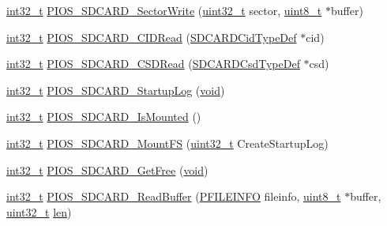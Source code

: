 \begin{DoxyCompactItemize}
\hyperlink{group___n_a_m_e_gafd12020da5a235dfcf0c3c748fb5baed}{int32\-\_\-t} \hyperlink{group___p_i_o_s___s_d_c_a_r_d_ga403eed1235aab15c3f4dffd530359a41}{P\-I\-O\-S\-\_\-\-S\-D\-C\-A\-R\-D\-\_\-\-Sector\-Write} (\hyperlink{stdint_8h_a435d1572bf3f880d55459d9805097f62}{uint32\-\_\-t} sector, \hyperlink{stdint_8h_aba7bc1797add20fe3efdf37ced1182c5}{uint8\-\_\-t} $\ast$buffer)
\item 
\hyperlink{group___n_a_m_e_gafd12020da5a235dfcf0c3c748fb5baed}{int32\-\_\-t} \hyperlink{group___p_i_o_s___s_d_c_a_r_d_gac315de3fafd3370f39b241ec5b7a62ca}{P\-I\-O\-S\-\_\-\-S\-D\-C\-A\-R\-D\-\_\-\-C\-I\-D\-Read} (\hyperlink{struct_s_d_c_a_r_d_cid_type_def}{S\-D\-C\-A\-R\-D\-Cid\-Type\-Def} $\ast$cid)
\item 
\hyperlink{group___n_a_m_e_gafd12020da5a235dfcf0c3c748fb5baed}{int32\-\_\-t} \hyperlink{group___p_i_o_s___s_d_c_a_r_d_gaee8853b1431664b014c45d438c4fb094}{P\-I\-O\-S\-\_\-\-S\-D\-C\-A\-R\-D\-\_\-\-C\-S\-D\-Read} (\hyperlink{struct_s_d_c_a_r_d_csd_type_def}{S\-D\-C\-A\-R\-D\-Csd\-Type\-Def} $\ast$csd)
\item 
\hyperlink{group___n_a_m_e_gafd12020da5a235dfcf0c3c748fb5baed}{int32\-\_\-t} \hyperlink{group___p_i_o_s___s_d_c_a_r_d_ga2a97c001315383e1e5bee1beb6bd9b93}{P\-I\-O\-S\-\_\-\-S\-D\-C\-A\-R\-D\-\_\-\-Startup\-Log} (\hyperlink{group___n_a_m_e_ga18028b8badbf1ea7e704ccac3c488e82}{void})
\item 
\hyperlink{group___n_a_m_e_gafd12020da5a235dfcf0c3c748fb5baed}{int32\-\_\-t} \hyperlink{group___p_i_o_s___s_d_c_a_r_d_gaeccd9489675f220997e2cd1bb825ab11}{P\-I\-O\-S\-\_\-\-S\-D\-C\-A\-R\-D\-\_\-\-Is\-Mounted} ()
\item 
\hyperlink{group___n_a_m_e_gafd12020da5a235dfcf0c3c748fb5baed}{int32\-\_\-t} \hyperlink{group___p_i_o_s___s_d_c_a_r_d_ga72165efe2dd7fd31025395961c6d78f7}{P\-I\-O\-S\-\_\-\-S\-D\-C\-A\-R\-D\-\_\-\-Mount\-F\-S} (\hyperlink{stdint_8h_a435d1572bf3f880d55459d9805097f62}{uint32\-\_\-t} Create\-Startup\-Log)
\item 
\hyperlink{group___n_a_m_e_gafd12020da5a235dfcf0c3c748fb5baed}{int32\-\_\-t} \hyperlink{group___p_i_o_s___s_d_c_a_r_d_gacb11ba0cff19017b7a01c2afc3c1d3cf}{P\-I\-O\-S\-\_\-\-S\-D\-C\-A\-R\-D\-\_\-\-Get\-Free} (\hyperlink{group___n_a_m_e_ga18028b8badbf1ea7e704ccac3c488e82}{void})
\item 
\hyperlink{group___n_a_m_e_gafd12020da5a235dfcf0c3c748fb5baed}{int32\-\_\-t} \hyperlink{group___p_i_o_s___s_d_c_a_r_d_ga51efc027e8fdf9478c3fc7f0a33e4d7b}{P\-I\-O\-S\-\_\-\-S\-D\-C\-A\-R\-D\-\_\-\-Read\-Buffer} (\hyperlink{_common_2_libraries_2dosfs_2dosfs_8h_a7e176967adef3fee89b5cc83d7daa32e}{P\-F\-I\-L\-E\-I\-N\-F\-O} fileinfo, \hyperlink{stdint_8h_aba7bc1797add20fe3efdf37ced1182c5}{uint8\-\_\-t} $\ast$buffer, \hyperlink{stdint_8h_a435d1572bf3f880d55459d9805097f62}{uint32\-\_\-t} \hyperlink{mavlink__helpers_8h_aba59486c1504340293255a065b546e3a}{len})

\end{DoxyCompactItemize}
